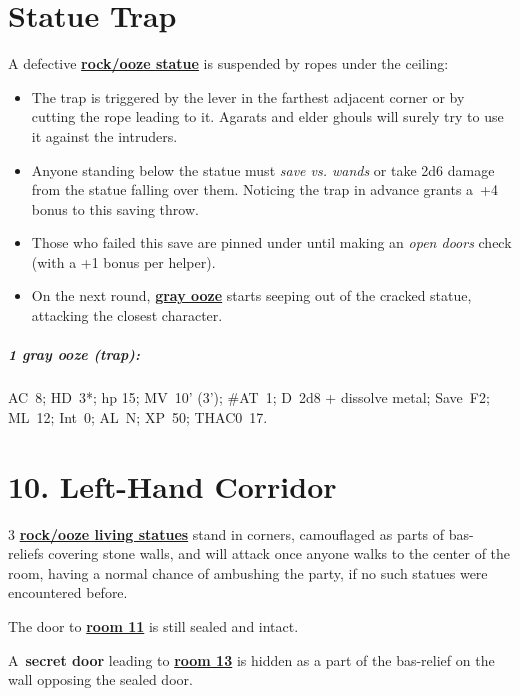 \documentclass[english,11pt,openany,letterpaper,twocolumn]{book}
\begin{document}
\hypertarget{statue-trap}{}
\section{Statue Trap}

A defective \hyperlink{statue}{\textbf{rock/ooze statue}} is suspended by ropes under the ceiling:

\begin{itemize}[leftmargin=*]
	\item The trap is triggered by the lever in the farthest adjacent corner or by cutting the rope leading to it. Agarats and elder ghouls will surely try to use it against the intruders.
	\item Anyone standing below the statue must \emph{save vs. wands} or take 2d6 damage from the statue falling over them. Noticing the trap in advance grants a~+4 bonus to this saving throw.
	\item Those who failed this save are pinned under until making an \emph{open doors} check (with a +1 bonus per helper).
	\item On the next round, \hyperlink{gray-ooze}{\textbf{gray ooze}} starts seeping out of the cracked statue, attacking the closest character.
\end{itemize}

\break
\vspace*{-1.11\baselineskip}
\begin{textbox}
	\subparagraph{1 gray ooze (trap):} AC~8; HD~3*; hp 15; MV~10' (3'); \#AT~1; D~2d8 + dissolve metal; Save~F2; ML~12; Int~0; AL~N; XP~50; THAC0~17.
\end{textbox}



\hypertarget{room10}{}
\section{10. Left-Hand Corridor}

3 \hyperlink{statue}{\textbf{rock/ooze living statues}} stand in corners, camouflaged as parts of bas- reliefs covering stone walls, and will attack once anyone walks to the center of the room, having a normal chance of ambushing the party, if no such statues were encountered before.

\tab The door to \hyperlink{room11}{\textbf{room 11}} is still sealed and intact.

\tab A~\textbf{secret door} leading to \hyperlink{room13}{\textbf{room 13}} is hidden as a part of the bas-relief on the wall opposing the sealed door.
\end{document}
